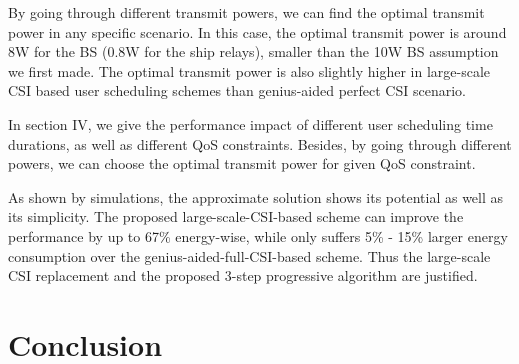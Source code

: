 \documentclass[journal]{IEEEtran}
\begin{document}
   By going through different transmit powers, we can find the optimal transmit power in any specific scenario. In this case, the optimal transmit power is around 8W for the BS (0.8W for the ship relays), smaller than the 10W BS assumption we first made. The optimal transmit power is also slightly higher in large-scale CSI based user scheduling schemes than genius-aided perfect CSI scenario. 
   
  
   In section IV, we give the performance impact of different user scheduling time durations, as well as different QoS constraints. 
   Besides, by going through different powers, we can choose the optimal transmit power for given QoS constraint. 
   
   
   As shown by simulations, the approximate solution shows its potential as well as its simplicity. The proposed large-scale-CSI-based scheme can improve the performance by up to 67\% energy-wise, while only suffers 5\% - 15\% larger energy consumption over the genius-aided-full-CSI-based scheme. Thus the large-scale CSI replacement and the proposed 3-step progressive algorithm are justified. 
  
  
   
   \section{Conclusion}\label{sec:5}
   
\end{document}
